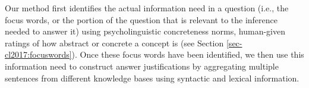 %

Our method first identifies the actual information need in a question (i.e., the focus words, or the portion of the question that is relevant to the inference needed to answer it) using psycholinguistic concreteness norms, human-given ratings of how abstract or concrete a concept is (see Section \ref{sec-cl2017:focuswords}).
Once these focus words have been identified, we then use this information need to construct answer justifications by aggregating multiple sentences from different knowledge bases using syntactic and lexical information.  


